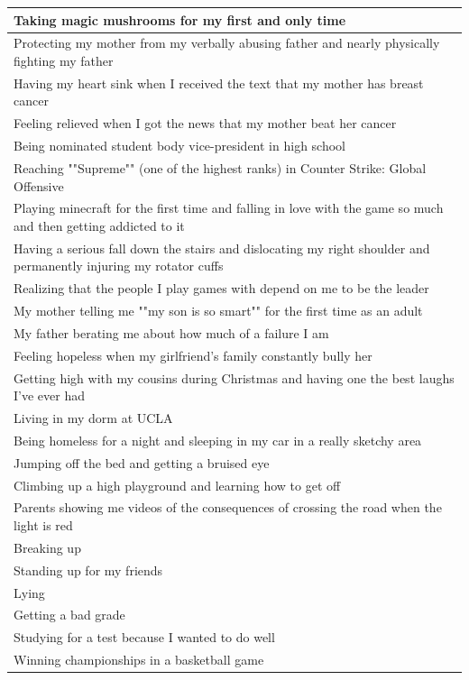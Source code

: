 \documentclass[
  .7em,
  letterpaper,
  DIV=11,
  numbers=noendperiod]{scrartcl}
\begin{document}
\begin{table}
\begin{tabular}{l}
\hline
Taking magic mushrooms for my first and only time\\
\hline
Protecting my mother from my verbally abusing father and nearly physically fighting my father\\
\hline
Having my heart sink when I received the text that my mother has breast cancer\\
\hline
Feeling relieved when I got the news that my mother beat her cancer\\
\hline
Being nominated student body vice-president in high school\\
\hline
Reaching ""Supreme"" (one of the highest ranks) in Counter Strike: Global Offensive\\
\hline
Playing minecraft for the first time and falling in love with the game so much and then getting addicted to it\\
\hline
Having a serious fall down the stairs and dislocating my right shoulder and permanently injuring my rotator cuffs\\
\hline
Realizing that the people I play games with depend on me to be the leader\\
\hline
My mother telling me ""my son is so smart"" for the first time as an adult\\
\hline
My father berating me about how much of a failure I am\\
\hline
Feeling hopeless when my girlfriend's family constantly bully her\\
\hline
Getting high with my cousins during Christmas and having one the best laughs I've ever had\\
\hline
Living in my dorm at UCLA\\
\hline
Being homeless for a night and sleeping in my car in a really sketchy area\\
\hline
Jumping off the bed and getting a bruised eye\\
\hline
Climbing up a high playground and learning how to get off\\
\hline
Parents showing me videos of the consequences of crossing the road when the light is red\\
\hline
Breaking up\\
\hline
Standing up for my friends\\
\hline
Lying\\
\hline
Getting a bad grade\\
\hline
Studying for a test because I wanted to do well\\
\hline
Winning championships in a basketball game\\

\end{tabular}
\end{table}
\end{document}
